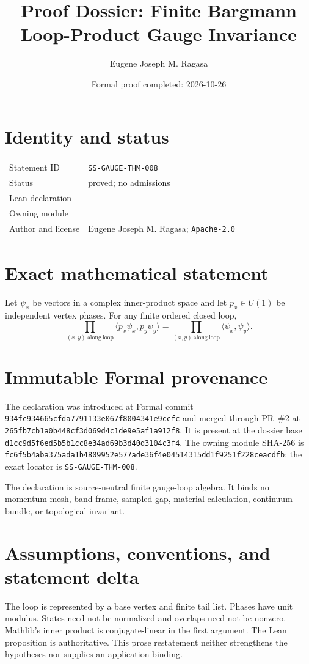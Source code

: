 \documentclass[11pt]{article}
\title{Proof Dossier: Finite Bargmann Loop-Product Gauge Invariance}
\author{Eugene Joseph M. Ragasa}
\date{Formal proof completed: 2026-10-26}
\begin{document}
\raggedright
\maketitle

\section{Identity and status}
\begin{tabularx}{\textwidth}{@{}lY@{}}
\toprule
Statement ID & \texttt{SS-GAUGE-THM-008} \\
Status & proved; no admissions \\
Lean declaration &  \\
Owning module &  \\
Author and license & Eugene Joseph M. Ragasa; \texttt{Apache-2.0} \\
\bottomrule
\end{tabularx}

\section{Exact mathematical statement}
Let $\psi_x$ be vectors in a complex inner-product space and let $p_x\in U(1)$ be independent vertex phases.  For any finite ordered closed loop,
\[
 \prod_{(x,y)\ \mathrm{along\ loop}}
   \langle p_x\psi_x,p_y\psi_y\rangle
 =\prod_{(x,y)\ \mathrm{along\ loop}}\langle\psi_x,\psi_y\rangle.
\]

\section{Immutable Formal provenance}
The declaration was introduced at Formal commit
\texttt{934fc934665cfda7791133e067f8004341e9ccfc} and merged through PR~\#2 at
\texttt{265fb7cb1a0b448cf3d069d4c1de9e5af1a912f8}.  It is present at the dossier base
\texttt{d1cc9d5f6ed5b5b1cc8e34ad69b3d40d3104c3f4}.  The owning module SHA-256 is
\texttt{fc6f5b4aba375ada1b4809952e577ade36f4e04514315dd1f9251f228ceacdfb}; the exact locator is \texttt{SS-GAUGE-THM-008}.

The declaration is source-neutral finite gauge-loop algebra.  It binds no momentum mesh, band frame, sampled gap, material calculation, continuum bundle, or topological invariant.

\section{Assumptions, conventions, and statement delta}
The loop is represented by a base vertex and finite tail list.  Phases have unit modulus.  States need not be normalized and overlaps need not be nonzero.  Mathlib's inner product is conjugate-linear in the first argument.
The Lean proposition is authoritative.  This prose restatement neither strengthens the hypotheses
nor supplies an application binding.
\end{document}
